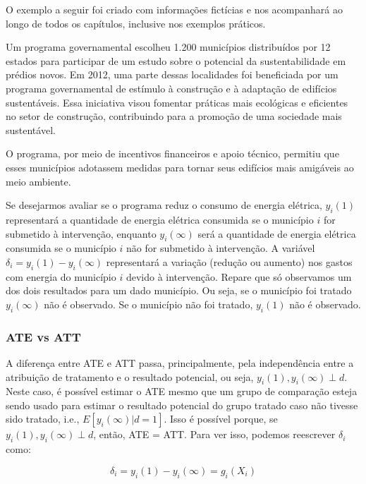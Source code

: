 \documentclass[portugues]{article}
\begin{document}
O exemplo a seguir foi criado com informações fictícias e nos acompanhará ao longo de todos os capítulos, inclusive nos exemplos práticos.

\begin{boxA}\label{ex:sust0}
    Um programa governamental escolheu 1.200 municípios distribuídos por 12 estados para participar de um estudo sobre o potencial da sustentabilidade em prédios novos. Em 2012, uma parte dessas localidades foi beneficiada por um programa governamental de estímulo à construção e à adaptação de edifícios sustentáveis. Essa iniciativa visou fomentar práticas mais ecológicas e eficientes no setor de construção, contribuindo para a promoção de uma sociedade mais sustentável.

    O programa, por meio de incentivos financeiros e apoio técnico, permitiu que esses municípios adotassem medidas para tornar seus edifícios mais amigáveis ao meio ambiente.
   
    Se desejarmos avaliar se o programa reduz o consumo de energia elétrica, $y_{i}(1)$ representará a quantidade de energia elétrica consumida se o município $i$ for submetido à intervenção, enquanto $y_{i}(\infty)$ será a quantidade de energia elétrica consumida se o município $i$ não for submetido à intervenção. A variável $\delta_{i} = y_i(1) - y_i(\infty)$ representará a variação (redução ou aumento) nos gastos com energia do município $i$ devido à intervenção. Repare que só observamos um dos dois resultados para um dado município. Ou seja, se o município foi tratado $y_i(\infty)$ não é observado. Se o município não foi tratado, $y_i(1)$ não é observado.
\end{boxA}

\subsubsection{ATE vs ATT} \label{sec:ATT_X_ATE}

A diferença entre ATE e ATT passa, principalmente, pela independência entre a atribuição de tratamento e o resultado potencial, ou seja, $y_{i}(1), y_{i}(\infty) \perp d$. Neste caso, é possível estimar o ATE mesmo que um grupo de comparação esteja sendo usado para estimar o resultado potencial do grupo tratado caso não tivesse sido tratado, i.e., $E[y_i(\infty)|d=1]$. Isso é possível porque, se $y_{i}(1), y_{i}(\infty) \perp d$, então, ATE = ATT. Para ver isso, podemos reescrever $\delta_i$ como:

\begin{equation}\label{eq:delta_i_x}
    \delta_i = y_{i}(1) - y_{i}(\infty) = g_i(X_i)
\end{equation}
\end{document}

